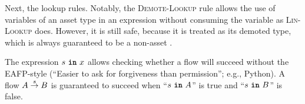 \documentclass[dvipsnames, usenames, sigconf]{acmart}
\begin{document}
Next, the lookup rules.
Notably, the \textsc{Demote-Lookup} rule allows the use of variables of an asset type in an expression without consuming the variable as \textsc{Lin-Lookup} does.
However, it is still safe, because it is treated as its demoted type, which is always guaranteed to be a non-asset .

\begin{mathpar}



\end{mathpar}

The expression $s~\varin~x$ allows checking whether a flow will succeed without the EAFP-style (``Easier to ask for forgiveness than permission''; e.g., Python).
A flow $A \sends{s} B$ is guaranteed to succeed when ``$s~\varin~A$'' is true and ``$s~\varin~B$'' is false.
\begin{mathpar}
\end{mathpar}
\end{document}
